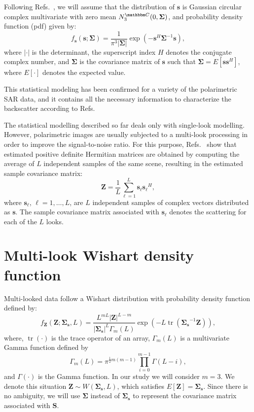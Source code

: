 \documentclass[conference]{IEEEtran}
\DeclareMathOperator{\traco}{tr}
\begin{document}
Following Refs.~\cite{good, lee}, we will assume that the distribution of $\mathbf{s}$ is Gaussian circular complex multivariate with zero mean $N^{\mathbbm C}_3(0,\mathbf{\Sigma})$, and probability density function (pdf) given by:
\begin{equation}
    f_{\mathbf{s}}(\mathbf{s};\mathbf{\Sigma})=\frac{1}{\pi^3|\mathbf{\Sigma}|} \exp(-\mathbf{s}^H\mathbf{\Sigma}^{-1}\mathbf{s}),
    \label{eq_02}
\end{equation}
where $|\cdot|$ is the determinant, 
the superscript index $H$ denotes the conjugate complex number, 
and $\mathbf{\Sigma}$ is the covariance matrix of $\mathbf{s}$ such that $\mathbf{\Sigma}=E[\mathbf{ss}^H]$, where $E[\cdot]$ denotes the expected value. 

This statistical modeling has been confirmed for a variety of the polarimetric SAR data, and it contains all the necessary information to characterize the backscatter according to Refs.~\cite{sarabendi,mfp}
 
The statistical modelling described so far deals only with single-look modelling.
However, polarimetric images are usually subjected to a multi-look processing in order to improve the signal-to-noise ratio. 
For this purpose, Refs.~\cite{good, ade} show that estimated positive definite Hermitian matrices are obtained by computing the average of $L$ independent samples of the same scene, resulting in the estimated sample covariance matrix:
\begin{equation}
    \mathbf{Z}=\frac{1}{L}\sum_{\ell=1}^{L} {\mathbf{s}_\ell}{\mathbf{s}_\ell}^H,
    \label{eq_03}
\end{equation}
where $\mathbf{s}_\ell$, $\ell = 1, \dots, L$, are $L$ independent samples of complex vectors distributed as $\mathbf{s}$. 
The sample covariance matrix associated with $\mathbf{s}_\ell$ denotes the scattering for each of the $L$ looks.

\section{Multi-look Wishart density function}\label{sec_03}

Multi-looked data follow a Wishart distribution with probability density function defined by:
\begin{equation}
    f_{\mathbf{Z}}(\mathbf{Z};\mathbf{\Sigma_{s}},L)=\frac{L^{mL}|\mathbf{Z}|^{L-m}}{|\mathbf{\Sigma_{s}}|^{L}\Gamma_m(L)} \exp(-L\traco(\mathbf{\Sigma_{s}}^{-1}\mathbf{Z})),
    \label{eq_04}
\end{equation} 
where, $\traco(\cdot)$ is the trace operator of an array, $\Gamma_m(L)$ is a multivariate Gamma function defined by
\begin{equation*}
	\Gamma_m(L)=\pi^{\frac{1}{2}m(m-1)} \prod_{i=0}^{m-1}\Gamma(L-i),
\end{equation*}
and $\Gamma(\cdot)$ is the Gamma function.
In our study we will consider $m=3$. 
We denote this situation $\mathbf{Z}\sim W(\mathbf{\Sigma_{s}}, L)$, which satisfies $E[\mathbf{Z}]=\mathbf{\Sigma_{s}}$. 
Since there is no ambiguity, we will use $\mathbf{\Sigma}$ instead of $\mathbf{\Sigma_{s}}$ to represent the covariance matrix associated with $\mathbf{S}$.
\end{document}
